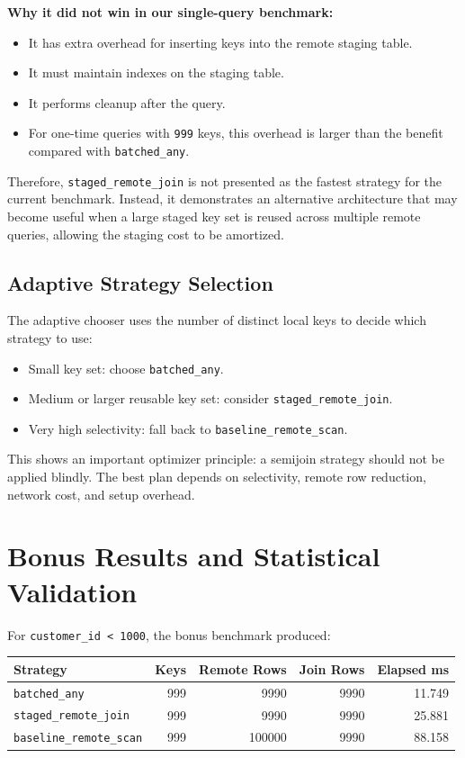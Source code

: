 \documentclass[10pt,a4paper]{article}
\begin{document}
\textbf{Why it did not win in our single-query benchmark:}

\begin{itemize}
    \item It has extra overhead for inserting keys into the remote staging table.
    \item It must maintain indexes on the staging table.
    \item It performs cleanup after the query.
    \item For one-time queries with \texttt{999} keys, this overhead is larger than the benefit compared with \texttt{batched\_any}.
\end{itemize}

Therefore, \texttt{staged\_remote\_join} is not presented as the fastest strategy for the current benchmark. Instead, it demonstrates an alternative architecture that may become useful when a large staged key set is reused across multiple remote queries, allowing the staging cost to be amortized.

\subsection{Adaptive Strategy Selection}

The adaptive chooser uses the number of distinct local keys to decide which strategy to use:

\begin{itemize}
    \item Small key set: choose \texttt{batched\_any}.
    \item Medium or larger reusable key set: consider \texttt{staged\_remote\_join}.
    \item Very high selectivity: fall back to \texttt{baseline\_remote\_scan}.
\end{itemize}

This shows an important optimizer principle: a semijoin strategy should not be applied blindly. The best plan depends on selectivity, remote row reduction, network cost, and setup overhead.

\section{Bonus Results and Statistical Validation}

For \texttt{customer\_id < 1000}, the bonus benchmark produced:

\begin{table}[h]
\centering
\small
\begin{tabular}{lrrrr}
\toprule
\textbf{Strategy} & \textbf{Keys} & \textbf{Remote Rows} & \textbf{Join Rows} & \textbf{Elapsed ms} \\
\midrule
\texttt{batched\_any} & 999 & 9990 & 9990 & 11.749 \\
\texttt{staged\_remote\_join} & 999 & 9990 & 9990 & 25.881 \\
\texttt{baseline\_remote\_scan} & 999 & 100000 & 9990 & 88.158 \\
\bottomrule
\end{tabular}
\end{table}
\end{document}
